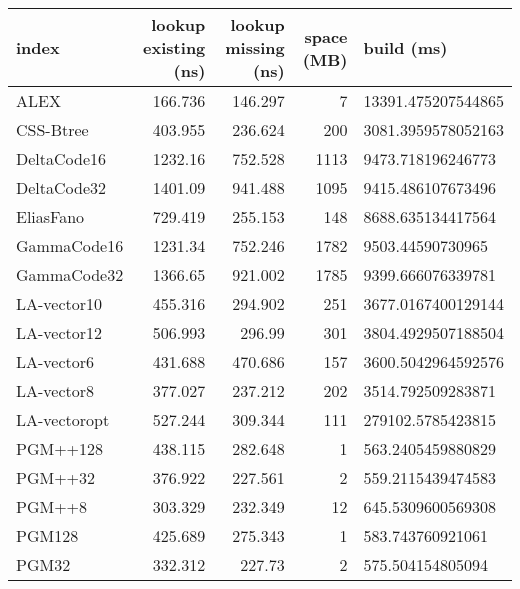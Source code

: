 \begin{tabular}{lrrrl}
\hline
 index             &   lookup existing (ns) &   lookup missing (ns) &   space (MB) & build (ms)         \\
\hline
 ALEX              &                166.736 &              146.297  &            7 & 13391.475207544865 \\
 CSS-Btree         &                403.955 &              236.624  &          200 & 3081.3959578052163 \\
 DeltaCode16       &               1232.16  &              752.528  &         1113 & 9473.718196246773  \\
 DeltaCode32       &               1401.09  &              941.488  &         1095 & 9415.486107673496  \\
 EliasFano         &                729.419 &              255.153  &          148 & 8688.635134417564  \\
 GammaCode16       &               1231.34  &              752.246  &         1782 & 9503.44590730965   \\
 GammaCode32       &               1366.65  &              921.002  &         1785 & 9399.666076339781  \\
 LA-vector10       &                455.316 &              294.902  &          251 & 3677.0167400129144 \\
 LA-vector12       &                506.993 &              296.99   &          301 & 3804.4929507188504 \\
 LA-vector6        &                431.688 &              470.686  &          157 & 3600.5042964592576 \\
 LA-vector8        &                377.027 &              237.212  &          202 & 3514.792509283871  \\
 LA-vectoropt      &                527.244 &              309.344  &          111 & 279102.5785423815  \\
 PGM++128          &                438.115 &              282.648  &            1 & 563.2405459880829  \\
 PGM++32           &                376.922 &              227.561  &            2 & 559.2115439474583  \\
 PGM++8            &                303.329 &              232.349  &           12 & 645.5309600569308  \\
 PGM128            &                425.689 &              275.343  &            1 & 583.743760921061   \\
 PGM32             &                332.312 &              227.73   &            2 & 575.504154805094   \\

\end{tabular}
